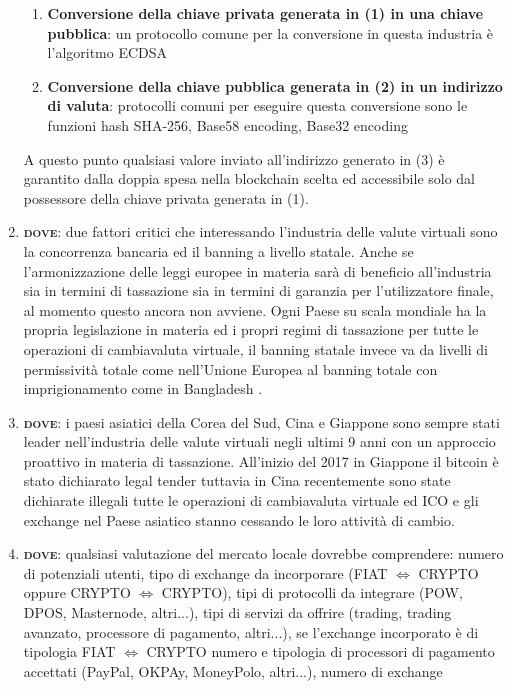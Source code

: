 \begin{enumerate}
\begin{enumerate}[label*=\arabic*.]
			\item \textbf{Conversione della chiave privata generata in (1) in una chiave pubblica}: un protocollo comune per la conversione
			in questa industria è l'algoritmo ECDSA
			\item \textbf{Conversione della chiave pubblica generata in (2) in un indirizzo di valuta}: protocolli comuni per eseguire questa
			conversione sono le funzioni hash SHA-256, Base58 encoding, Base32 encoding
		\end{enumerate}
	A questo punto qualsiasi valore inviato all'indirizzo generato in (3) è garantito dalla doppia spesa nella blockchain scelta ed accessibile
	solo dal possessore della chiave privata generata in (1).
	\item \textbf{\textsc{dove}}: due fattori critici che interessando l'industria delle valute virtuali sono la concorrenza bancaria ed il 
	banning a livello statale. Anche se l'armonizzazione delle leggi europee in materia sarà di beneficio all'industria sia in termini di 
	tassazione sia in termini di garanzia per l'utilizzatore finale, al momento questo ancora non avviene. Ogni Paese su scala mondiale 
	ha la propria legislazione in materia ed i propri regimi di tassazione per tutte le operazioni di cambiavaluta virtuale,
	il banning statale invece va da livelli	di permissività totale come nell'Unione Europea al banning totale con 
	imprigionamento come in Bangladesh \cite{bitcoinLegality}. 
	\item \textbf{\textsc{dove}}: i paesi asiatici della Corea del Sud, Cina e Giappone sono sempre stati leader nell'industria delle valute virtuali
	negli ultimi 9 anni con un approccio proattivo in materia di tassazione. All'inizio del 2017 in Giappone il bitcoin è stato 
	dichiarato legal tender tuttavia in Cina recentemente sono state dichiarate illegali tutte le operazioni di cambiavaluta virtuale ed ICO 
	e gli exchange nel Paese asiatico stanno cessando le loro attività di cambio. 
	\item \textbf{\textsc{dove}}: qualsiasi valutazione del mercato locale dovrebbe comprendere: numero di potenziali utenti, tipo di exchange da 
	incorporare (FIAT $\Leftrightarrow$ CRYPTO oppure CRYPTO $\Leftrightarrow$ CRYPTO), tipi di protocolli da integrare (POW, DPOS, Masternode, altri...), 
	tipi di servizi da offrire (trading, trading avanzato, processore di pagamento, altri...), se l'exchange incorporato è di tipologia
	FIAT $\Leftrightarrow$ CRYPTO numero e tipologia di processori di pagamento accettati (PayPal, OKPAy, MoneyPolo, altri...), numero di exchange

\end{enumerate}
